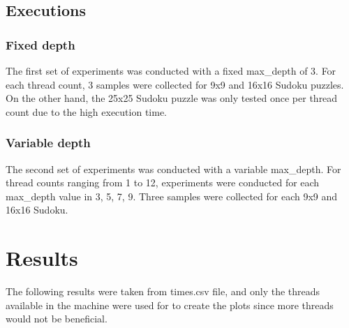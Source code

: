 \documentclass[a4paper,10pt]{article}
\begin{document}
\begin{multicols}{2}
\subsection{Executions}

\subsubsection{Fixed depth}

The first set of experiments was conducted with a fixed max\_depth of 3. For each thread count, 3 samples were collected for 9x9 and 16x16 Sudoku puzzles. On the other hand, the 25x25 Sudoku puzzle was only tested once per thread count due to the high execution time.

\subsubsection{Variable depth}
The second set of experiments was conducted with a variable max\_depth. For thread counts ranging from 1 to 12, experiments were conducted for each max\_depth value in {3, 5, 7, 9}. Three samples were collected for each 9x9 and 16x16 Sudoku.






\section{Results}

The following results were taken from times.csv file, and only the threads available in the machine were used for to create the plots since more threads would not be beneficial.


\end{multicols}
\end{document}
